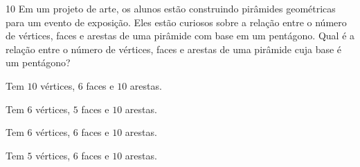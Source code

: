 
\num{10} Em um projeto de arte, os alunos estão construindo pirâmides geométricas
para um evento de exposição. Eles estão curiosos sobre a relação entre o número de
vértices, faces e arestas de uma pirâmide com base em um pentágono. Qual é a relação
entre o número de vértices, faces e arestas de uma pirâmide cuja base é um pentágono?

\begin{escolha}
\item Tem $10$ vértices, $6$ faces e $10$ arestas.

\item Tem $6$ vértices, $5$ faces e $10$ arestas.

\item Tem $6$ vértices, $6$ faces e $10$ arestas.

\item Tem $5$ vértices, $6$ faces e $10$ arestas.
\end{escolha}



